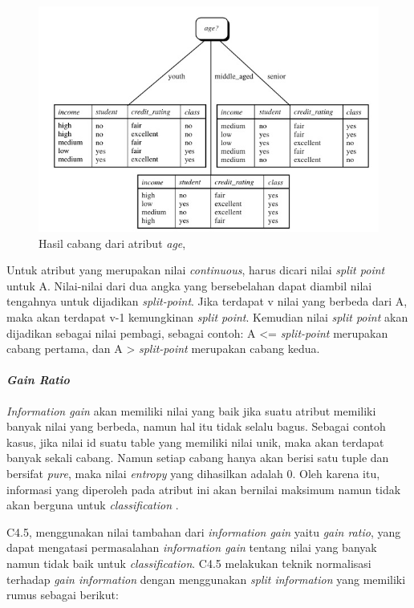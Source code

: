 \begin{figure}
\includegraphics[scale=1]{Gambar/hasilcabangid3.jpg}
\caption[Hasil pohon faktor pada atribut \textsl{age} dari table 2.1]{Hasil cabang dari atribut \textsl{age}, \cite{DM}} 
\label{fig:hasilCabang}
\end{figure}

Untuk atribut yang merupakan nilai \textsl{continuous}, harus dicari nilai \textsl{split point} untuk A. Nilai-nilai dari dua angka yang bersebelahan dapat diambil nilai tengahnya untuk dijadikan \textsl{split-point}. Jika terdapat v nilai yang berbeda dari A, maka akan terdapat v-1 kemungkinan \textsl{split point}. Kemudian nilai \textsl{split point} akan dijadikan sebagai nilai pembagi, sebagai contoh: A <= \textsl{split-point} merupakan cabang pertama, dan A > \textsl{split-point} merupakan cabang kedua.

\paragraph{\textsl{Gain Ratio}}

\textsl{Information gain} akan memiliki nilai yang baik jika suatu atribut memiliki banyak nilai yang berbeda, namun hal itu tidak selalu bagus. Sebagai contoh kasus, jika nilai id suatu table yang memiliki nilai unik, maka akan terdapat banyak sekali cabang. Namun setiap cabang hanya akan berisi satu tuple dan bersifat \textsl{pure}, maka nilai \textsl{entropy} yang dihasilkan adalah 0. Oleh karena itu, informasi yang diperoleh pada atribut ini akan bernilai maksimum namun tidak akan berguna untuk \textsl{classification} \cite{DM}.

C4.5, menggunakan nilai tambahan dari \textsl{information gain} yaitu \textsl{gain ratio}, yang dapat mengatasi permasalahan \textsl{information gain} tentang nilai yang banyak namun tidak baik untuk \textsl{classification}. C4.5 melakukan teknik normalisasi terhadap \textsl{gain information} dengan menggunakan \textsl{split information} yang memiliki rumus sebagai berikut:

